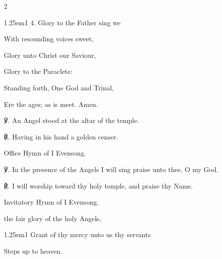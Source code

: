 \begin{paracol}{2}
\begin{hangparas}{1.25em}{1}
4. Glory to the Father sing we

With resounding voices sweet,

Glory unto Christ our Saviour,

Glory to the Paraclete:

Standing forth, One God and Trinal,

Ere the ages; as is meet. Amen.\\
\end{hangparas}

℣. An Angel stood at the altar of the temple.

℟. Having in his hand a golden censer.



\secondEvensong
{}

\begin{rubric}
	Office Hymn of I Evensong.
\end{rubric}

℣. In the presence of the Angels I will sing praise unto thee, O my God.

℟. I will worship toward thy holy temple, and praise thy Name.


\switchcolumn


\mattins
{}

\begin{rubric}
	Invitatory Hymn of I Evensong.
\end{rubric}

\mattinsOfficeHymn
{} the fair glory of the holy Angels,


\begin{hangparas}{1.25em}{1}
Grant of thy mercy unto us thy servants

Steps up to heaven.\\


\end{hangparas}
\end{paracol}
